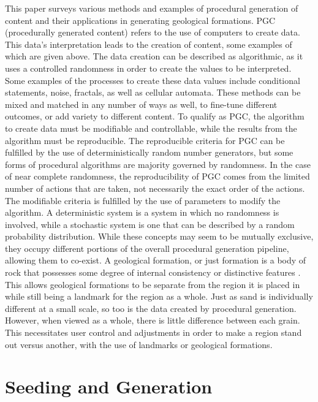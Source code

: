 \documentclass[10pt]{report}
\begin{document}
		This paper surveys various methods and examples of procedural generation of content and their applications in generating geological formations. PGC (procedurally generated content) refers to the use of computers to create data. This data's interpretation leads to the creation of content, some examples of which are given above. The data creation can be described as algorithmic, as it uses a controlled randomness in order to create the values to be interpreted. Some examples of the processes to create these data values include conditional statements, noise, fractals, as well as cellular automata. These methods can be mixed and matched in any number of ways as well, to fine-tune different outcomes, or add variety to different content. To qualify as PGC, the algorithm to create data must be modifiable and controllable, while the results from the algorithm must be reproducible. The reproducible criteria for PGC can be fulfilled by the use of deterministically random number generators, but some forms of procedural algorithms are majority governed by randomness. In the case of near complete randomness, the reproducibility of PGC comes from the limited number of actions that are taken, not necessarily the exact order of the actions. The modifiable criteria is fulfilled by the use of parameters to modify the algorithm. A deterministic system is a system in which no randomness is involved, while a stochastic system is one that can be described by a random probability distribution. While these concepts may seem to be mutually exclusive, they occupy different portions of the overall procedural generation pipeline, allowing them to co-exist. A geological formation, or just formation is a body of rock that possesses some degree of internal consistency or distinctive features \cite{2005}. This allows geological formations to be separate from the region it is placed in while still being a landmark for the region as a whole. Just as sand is individually different at a small scale, so too is the data created by procedural generation. However, when viewed as a whole, there is little difference between each grain. This necessitates user control and adjustments in order to make a region stand out versus another, with the use of landmarks or geological formations.
		
		\section{Seeding and Generation}
		
\end{document}

